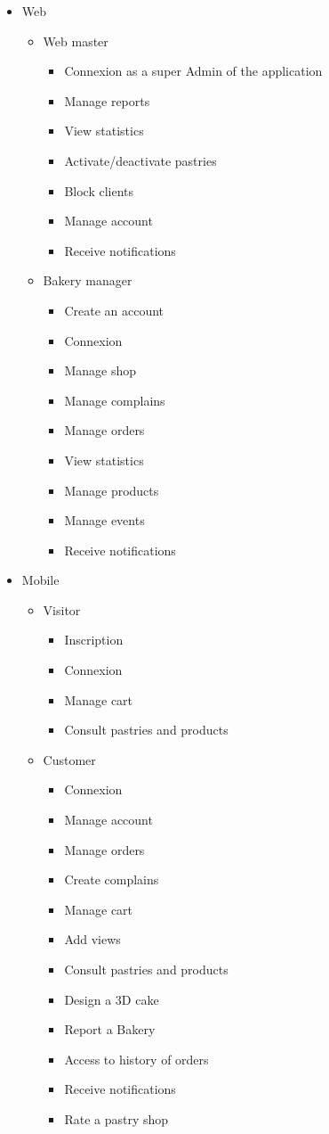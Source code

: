 \documentclass[12pt,a4paper]{report}
\begin{document}
	\begin{itemize}
		\item Web
		\begin{itemize}
			\item  Web master
			\begin{itemize}
				\item Connexion as a super Admin of the application
				\item Manage reports
				\item View statistics
				\item Activate/deactivate pastries
				\item Block clients
				\item Manage account
				\item Receive notifications
				
			\end{itemize}
			\item  Bakery manager	
			\begin{itemize}
				\item Create an account
				\item Connexion
				\item Manage shop
				\item Manage complains
				\item Manage orders
				\item View statistics
				\item Manage products
				\item Manage events	
				\item Receive notifications			
			\end{itemize}
		\end{itemize}
		\item Mobile
		\begin{itemize}
			\item Visitor
			\begin{itemize}
				\item Inscription
				\item Connexion
				\item Manage cart
				\item Consult pastries and products
			\end{itemize}
			\item Customer
			\begin{itemize}
				\item Connexion
				\item Manage account
				\item Manage orders
				\item Create complains
				\item Manage cart
				\item Add views
				\item Consult pastries and products
				\item Design a 3D cake
				\item Report a Bakery
				\item Access to history of orders
				\item Receive notifications
				\item Rate a pastry shop
			\end{itemize}
			

\end{itemize}
\end{itemize}
\end{document}
